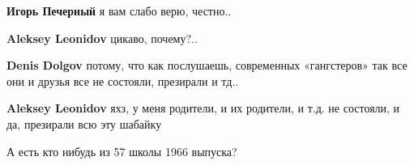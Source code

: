 \begin{itemize}
\begin{itemize}
\begin{itemize}
 
\textbf{Игорь Печерный} я вам слабо верю, честно..


 
\textbf{Aleksey Leonidov} цикаво, почему?..


 
\textbf{Denis Dolgov} потому, что как послушаешь, современных «гангстеров» так все они и друзья все не состояли, презирали и тд..


 
\textbf{Aleksey Leonidov} яхз, у меня родители, и их родители, и т.д. не состояли, и да, презирали всю эту шабайку
\end{itemize}

\end{itemize}

 
А есть кто нибудь из 57 школы 1966 выпуска?

\begin{itemize}
 

\end{itemize}
\end{itemize}
